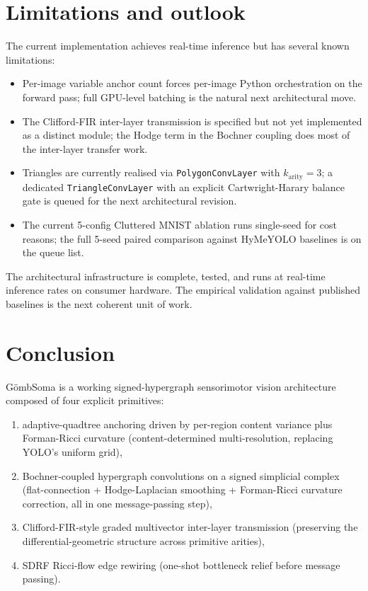 \documentclass[11pt,a4paper]{article}
\newcommand{\GS}{G\"ombSoma}
\begin{document}
\section{Limitations and outlook}

The current implementation achieves real-time inference but has
several known limitations:

\begin{itemize}
\item Per-image variable anchor count forces per-image Python
  orchestration on the forward pass; full GPU-level batching is
  the natural next architectural move.
\item The Clifford-FIR inter-layer transmission is specified but
  not yet implemented as a distinct module; the Hodge term in the
  Bochner coupling does most of the inter-layer transfer work.
\item Triangles are currently realised via \texttt{PolygonConvLayer}
  with $k_\text{arity} = 3$; a dedicated \texttt{TriangleConvLayer}
  with an explicit Cartwright-Harary balance gate is queued for the
  next architectural revision.
\item The current 5-config Cluttered MNIST ablation runs single-seed
  for cost reasons; the full 5-seed paired comparison against
  HyMeYOLO baselines is on the queue list.
\end{itemize}

The architectural infrastructure is complete, tested, and runs at
real-time inference rates on consumer hardware. The empirical
validation against published baselines is the next coherent unit
of work.

\section{Conclusion}

\GS{} is a working signed-hypergraph sensorimotor vision
architecture composed of four explicit primitives:

\begin{enumerate}
\item adaptive-quadtree anchoring driven by per-region content
  variance plus Forman-Ricci curvature (content-determined
  multi-resolution, replacing YOLO's uniform grid),
\item Bochner-coupled hypergraph convolutions on a signed
  simplicial complex (flat-connection + Hodge-Laplacian smoothing
  + Forman-Ricci curvature correction, all in one message-passing
  step),
\item Clifford-FIR-style graded multivector inter-layer
  transmission (preserving the differential-geometric structure
  across primitive arities),
\item SDRF Ricci-flow edge rewiring (one-shot bottleneck relief
  before message passing).
\end{enumerate}
\end{document}
